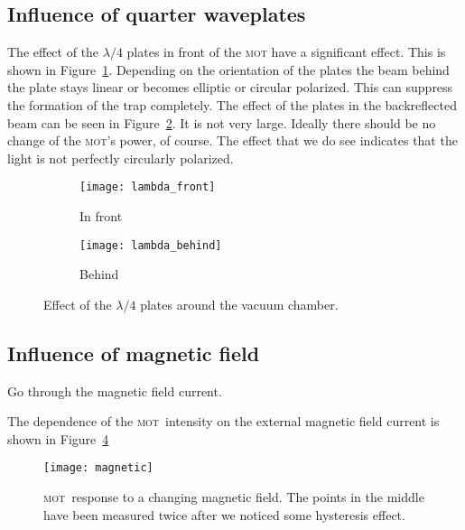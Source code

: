 \documentclass[11pt, english, fleqn, DIV=15, headinclude, BCOR=2cm]{scrreprt}
\newcommand\mot{\textsc{mot}}
\begin{document}
\subsection{Influence of quarter waveplates}

The effect of the $\lambda/4$ plates in front of the \mot{} have a significant
effect. This is shown in Figure~\ref{fig:lambda_front}. Depending on the
orientation of the plates the beam behind the plate stays linear or becomes
elliptic or circular polarized. This can suppress the formation of the
trap completely. The effect of the plates in the
backreflected beam can be seen in Figure~\ref{fig:lambda_behind}. It is not very
large. Ideally there should be no change of the \mot's power, of course. The
effect that we do see indicates that the light is not perfectly circularly
polarized.

\begin{figure}
    \centering
    \begin{subfigure}[c]{0.48\linewidth}
    \centering
    \texttt{[image: lambda\_front]}
    \caption{%
        In front
    }
    \label{fig:lambda_front}
    \end{subfigure}
    \hfill
    \begin{subfigure}[c]{0.48\linewidth}
    \centering
    \texttt{[image: lambda\_behind]}
    \caption{%
        Behind
    }
    \label{fig:lambda_behind}
    \end{subfigure}
    \caption{%
        Effect of the $\lambda/4$ plates around the vacuum chamber.
    }
    \label{fig:}
\end{figure}

\subsection{Influence of magnetic field}

Go through the magnetic field current.


The dependence of the \mot\ intensity on the external magnetic field current is
shown in Figure~\ref{fig:magnetic}

\begin{figure}
    \centering
    \texttt{[image: magnetic]}
    \caption{%
        \mot\ response to a changing magnetic field. The points in the middle
        have been measured twice after we noticed some hysteresis effect.
    }
    \label{fig:magnetic}
\end{figure}
\end{document}
